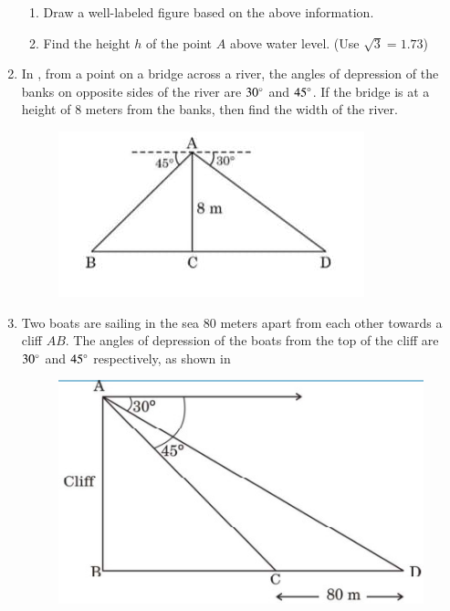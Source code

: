 \begin{enumerate}[label=\thesubsection.\arabic*.,ref=\thesubsection.\theenumi]
    \hfill{}
\begin{enumerate}
        \item Draw a well-labeled figure based on the above information.
        \item Find the height $h$ of the point $A$ above water level. (Use $\sqrt{3}=1.73$) 
    \end{enumerate}
%
\item In , from a point on a bridge across a river, the angles of depression of the banks on opposite sides of the river are $30\degree$ and $45\degree$. If the bridge is at a height of $8$ meters from the banks, then find the width of the river.
    \begin{figure}[H]
        \centering
        \includegraphics[width=\columnwidth]{cbse/figs/su.jpeg}
        \caption{}
        \label{fig:su.jpeg}
    \end{figure}
    \hfill{}
    \item Two boats are sailing in the sea $80$ meters apart from each other towards a cliff $AB$. The angles of depression of the boats from the top of the cliff are $30\degree$ and $45\degree$ respectively, as shown in 
%
    \begin{figure}[H]
        \centering
        \includegraphics[width=\columnwidth]{cbse/figs/boat.edit.jpeg}

\end{figure}
\end{enumerate}
